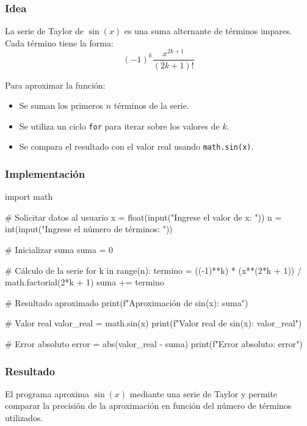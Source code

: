 \begin{solution}

\subsubsection*{Idea}
La serie de Taylor de \(\sin(x)\) es una suma alternante de términos impares. Cada término tiene la forma:
\[
(-1)^k \frac{x^{2k+1}}{(2k+1)!}
\]

Para aproximar la función:
\begin{itemize}
    \item Se suman los primeros \(n\) términos de la serie.
    \item Se utiliza un ciclo \texttt{for} para iterar sobre los valores de \(k\).
    \item Se compara el resultado con el valor real usando \texttt{math.sin(x)}.
\end{itemize}

\subsubsection*{Implementación}

\begin{pythonjupyter}
import math

# Solicitar datos al usuario
x = float(input("Ingrese el valor de x: "))
n = int(input("Ingrese el número de términos: "))

# Inicializar suma
suma = 0

# Cálculo de la serie
for k in range(n):
    termino = ((-1)**k) * (x**(2*k + 1)) / math.factorial(2*k + 1)
    suma += termino

# Resultado aproximado
print(f"Aproximación de sin(x): {suma}")

# Valor real
valor_real = math.sin(x)
print(f"Valor real de sin(x): {valor_real}")

# Error absoluto
error = abs(valor_real - suma)
print(f"Error absoluto: {error}")
\end{pythonjupyter}

\subsubsection*{Resultado}
El programa aproxima \(\sin(x)\) mediante una serie de Taylor y permite comparar la precisión de la aproximación en función del número de términos utilizados.

\end{solution}
